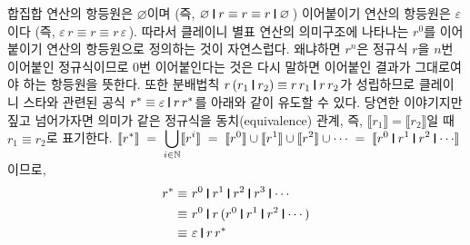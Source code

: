 \documentclass[b5paper,chapter,figtabcapt]{oblivoir}
\newcommand{\VERT}{\ensuremath{\mathop{\!\resizebox{1.65ex}{.7em}{\texttt{|}}\!}}}
\begin{document}
합집합 연산의 항등원은 $\varnothing$이며
(즉, $\varnothing \VERT r \equiv r \equiv r \VERT \varnothing\,$)
이어붙이기 연산의 항등원은 $\varepsilon$이다
(즉, $\varepsilon\,r \equiv r \equiv r\,\varepsilon\,$).
따라서 클레이니 별표 연산의 의미구조에 나타나는 $r^0$를
이어붙이기 연산의 항등원으로 정의하는 것이 자연스럽다.
왜냐하면 $r^n$은 정규식 $r$을 $n$번 이어붙인 정규식이므로
0번 이어붙인다는 것은 다시 말하면 이어붙인 결과가
그대로여야 하는 항등원을 뜻한다. 또한 분배법칙
$r\,(r_1 \VERT r_2) \equiv r\,r_1 \VERT r\,r_2$가 성립하므로
클레이니 스타와 관련된 공식 $r^{*} \equiv \varepsilon\VERT r\,r^{*}$를
아래와 같이 유도할 수 있다. 당연한 이야기지만 짚고 넘어가자면
의미가 같은 정규식을 동치(equivalence) 관계, 즉,
$\llbracket r_1 \rrbracket = \llbracket r_2 \rrbracket$일 때
$r_1 \equiv r_2$로 표기한다.
$\displaystyle
      \llbracket r^{*} \rrbracket
\;=\; \bigcup_{i\in\mathbb{N}}\llbracket r^i \rrbracket
\;=\; \llbracket r^0 \rrbracket \cup
      \llbracket r^1 \rrbracket \cup
      \llbracket r^2 \rrbracket \cup \cdots
\;=\; \llbracket r^0\VERT r^1\VERT r^2\VERT \cdots \rrbracket$이므로,
\vspace*{-1.5ex}
\begin{align*}
r^{*} \equiv~& r^0 \VERT r^1 \VERT r^2 \VERT r^3 \VERT \cdots
\\    \equiv~& r^0 \VERT r\,(r^0 \VERT r^1 \VERT r^2 \VERT \cdots)
\\    \equiv~& \varepsilon \VERT r\,r^{*}
\end{align*}
\end{document}
